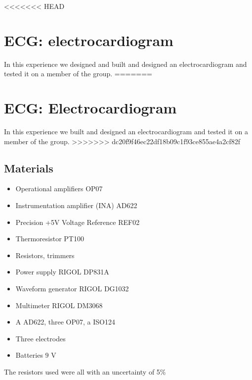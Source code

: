 <<<<<<< HEAD
\chapter{ECG: electrocardiogram}
In this experience we designed and built and designed an electrocardiogram and tested it on a member of the group.
=======
\chapter{ECG: Electrocardiogram}
In this experience we built and designed an electrocardiogram and tested it on a member of the group.
>>>>>>> dc20f9f46ec22df18b09c1f93ce855ae4a2cf82f

\section{Materials}
\begin{itemize}
\item Operational amplifiers OP07
\item Instrumentation amplifier (INA) AD622
\item Precision +5V Voltage Reference REF02
\item Thermoresistor PT100
\item Resistors, trimmers
\item Power supply RIGOL DP831A
\item Waveform generator RIGOL DG1032
\item Multimeter RIGOL DM3068
\item A AD622, three OP07, a ISO124
\item Three electrodes
\item Batteries $9$ V
\end{itemize}
The resistors used were all with an uncertainty of 5\%
